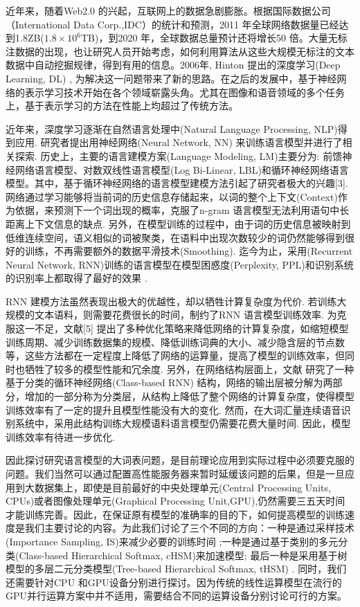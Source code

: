 \documentclass[12pt,a4paper]{article}
\begin{document}
近年来，随着Web2.0 的兴起，互联网上的数据急剧膨胀。根据国际数据公司（International Data Corp.,IDC）的统计和预测，2011 年全球网络数据量已经达到1.8ZB($1.8\times 10^6$TB)，到2020 年，全球数据总量预计还将增长50 倍。大量无标注数据的出现，也让研究人员开始考虑，如何利用算法从这些大规模无标注的文本数据中自动挖掘规律，得到有用的信息。2006年, Hinton 提出的深度学习(Deep Learning, DL) \cite{hinton2006reducing}, 为解决这一问题带来了新的思路。在之后的发展中，基于神经网络的表示学习技术开始在各个领域崭露头角。尤其在图像和语音领域的多个任务上，基于表示学习的方法在性能上均超过了传统方法。

近年来，深度学习逐渐在自然语言处理中(Natural Language Processing, NLP)得到应用. 研究者提出用神经网络(Neural Network, NN) 来训练语言模型并进行了相关探索\cite{DBLP:conf/nips/BengioDV00,DBLP:journals/csl/BayerR16}. 历史上，主要的语言建模方案(Language Modeling, LM)主要分为: 前馈神经网络语言模型、对数双线性语言模型(Log Bi-Linear, LBL)和循环神经网络语言模型。其中，基于循环神经网络的语言模型建模方法引起了研究者极大的兴趣[3]. 网络通过学习能够将当前词的历史信息存储起来，以词的整个上下文(Context)作为依据，来预测下一个词出现的概率，克服了n-gram 语言模型无法利用语句中长距离上下文信息的缺点. 另外，在模型训练的过程中，由于词的历史信息被映射到低维连续空间，语义相似的词被聚类，在语料中出现次数较少的词仍然能够得到很好的训练，不再需要额外的数据平滑技术(Smoothing). 迄今为止，采用(Recurrent Neural Network, RNN)训练的语言模型在模型困惑度(Perplexity, PPL)和识别系统的识别率上都取得了最好的效果 \cite{DBLP:conf/icassp/MikolovKBCK11}.

RNN 建模方法虽然表现出极大的优越性，却以牺牲计算复杂度为代价. 若训练大规模的文本语料，则需要花费很长的时间，制约了RNN 语言模型训练效率. 为克服这一不足，文献[5] 提出了多种优化策略来降低网络的计算复杂度，如缩短模型训练周期、减少训练数据集的规模、降低训练词典的大小、减少隐含层的节点数等，这些方法都在一定程度上降低了网络的运算量，提高了模型的训练效率，但同时也牺牲了较多的模型性能和冗余度. 另外，在网络结构层面上，文献\cite{DBLP:journals/coling/BrownPdLM92} 研究了一种基于分类的循环神经网络(Class-based RNN) 结构，网络的输出层被分解为两部分，增加的一部分称为分类层，从结构上降低了整个网络的计算复杂度，使得模型训练效率有了一定的提升且模型性能没有大的变化. 然而，在大词汇量连续语音识别系统中，采用此结构训练大规模语料语言模型仍需要花费大量时间. 因此，模型训练效率有待进一步优化.

因此探讨研究语言模型的大词表问题，是目前理论应用到实际过程中必须要克服的问题。我们当然可以通过配置高性能服务器来暂时延缓该问题的后果，但是一旦应用到大数据集上，即使是目前最好的中央处理单元(Central Processing Units, CPUs)或者图像处理单元(Graphical Processing Unit,GPU),仍然需要三五天时间才能训练完善。因此，在保证原有模型的准确率的目的下，如何提高模型的训练速度是我们主要讨论的内容。为此我们讨论了三个不同的方向：一种是通过采样技术(Importance Sampling, IS)来减少必要的训练时间 \cite{DBLP:journals/tnn/BengioS08};一种是通过基于类别的多元分类(Class-based Hierarchical Softmax, cHSM)来加速模型; 最后一种是采用基于树模型的多层二元分类模型(Tree-based Hierarchical Softmax, tHSM) \cite{DBLP:conf/nips/MikolovSCCD13,DBLP:conf/nips/MnihH08}. 同时，我们还需要针对CPU 和GPU设备分别进行探讨。因为传统的线性运算模型在流行的GPU并行运算方案中并不适用，需要结合不同的运算设备分别讨论可行的方案。
\end{document}
